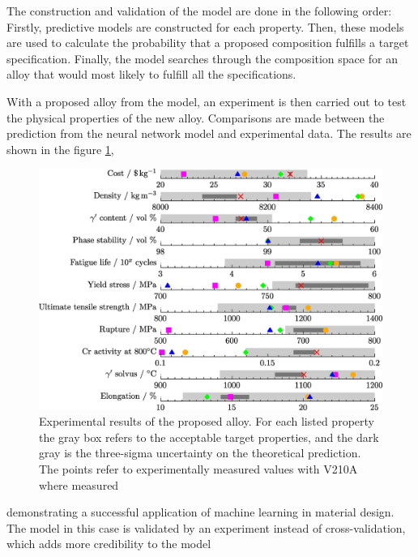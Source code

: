 \documentclass[aps,prb,twocolumn,superscriptaddress,floatfix]{revtex4-2}
\begin{document}
The construction and validation of the model are done in the following order:
Firstly, predictive models are constructed
for each property.
Then, these models are used to calculate the probability that a proposed composition fulfills a target specification.
Finally, the model searches through the composition space for an alloy that would most likely to fulfill all the specifications.

With a proposed alloy from the model, an experiment is then carried out to test the physical properties of the new alloy. Comparisons are made between the prediction from the neural network model and experimental data. The results are shown in the figure \ref{fig:NN_results},
\begin{figure}[h]
    \includegraphics[clip=true,width=\columnwidth]{CS_NN_results.jpeg}
    \caption{Experimental results of the proposed alloy. For each listed property the gray box refers to the acceptable target properties, and the dark gray is the three-sigma uncertainty on the theoretical prediction. The points refer to experimentally measured values with V210A where measured}
    \label{fig:NN_results}
\end{figure}
demonstrating a successful application of machine learning in material design. The model in this case is validated by an experiment instead of cross-validation, which adds more credibility to the model
\end{document}
